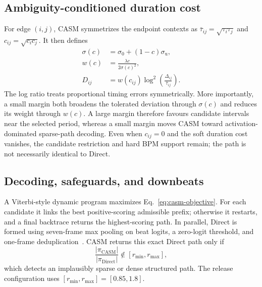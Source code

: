 \documentclass{article}
\begin{document}
\subsection{Ambiguity-conditioned duration cost}
For edge $(i,j)$, CASM symmetrizes the endpoint contexts as $\bar\tau_{ij}=\sqrt{\tau_i\tau_j}$ and $c_{ij}=\sqrt{c_i c_j}$. It then defines
\begin{equation}
\begin{aligned}
\sigma(c)&=\sigma_0+(1-c)\sigma_{\mathrm u},\\
w(c)&=\frac{\lambda c}{2\sigma(c)^2},\\
D_{ij}&=w(c_{ij})\log^2\!\left(\frac{\Delta_{ij}}{\bar\tau_{ij}}\right).
\end{aligned}
\label{eq:casm-duration}
\end{equation}
The log ratio treats proportional timing errors symmetrically. More importantly, a small margin both broadens the tolerated deviation through $\sigma(c)$ and reduces its weight through $w(c)$. A large margin therefore favours candidate intervals near the selected period, whereas a small margin moves CASM toward activation-dominated sparse-path decoding. Even when $c_{ij}=0$ and the soft duration cost vanishes, the candidate restriction and hard BPM support remain; the path is not necessarily identical to Direct.


\subsection{Decoding, safeguards, and downbeats}
A Viterbi-style dynamic program maximizes Eq.~\eqref{eq:casm-objective}. For each candidate it links the best positive-scoring admissible prefix; otherwise it restarts, and a final backtrace returns the highest-scoring path. In parallel, Direct is formed using seven-frame max pooling on beat logits, a zero-logit threshold, and one-frame deduplication~\cite{foscarin2024beat}. CASM returns this exact Direct path only if
\begin{equation}
\frac{|\pi_{\mathrm{CASM}}|}{|\pi_{\mathrm{Direct}}|}
\notin[r_{\min},r_{\max}],
\end{equation}
which detects an implausibly sparse or dense structured path. The release configuration uses $[r_{\min},r_{\max}]=[0.85,1.8]$.
\end{document}
